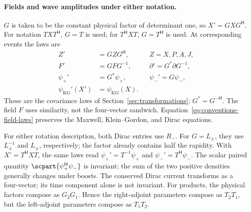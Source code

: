 \documentclass[11pt]{article}
\newcommand{\pv}[1]{{#1}}
\newcommand{\pvGreek}[1]{{#1}}
\newcommand{\pA}{\pv{A}}
\newcommand{\pF}{\pv{F}}
\newcommand{\pG}{\pv{G}}
\newcommand{\pJ}{\pv{J}}
\newcommand{\pL}{\pv{L}}
\newcommand{\pP}{\pv{P}}
\newcommand{\pR}{\pv{R}}
\newcommand{\pT}{\pv{T}}
\newcommand{\pX}{\pv{X}}
\newcommand{\pZ}{\pv{Z}}
\newcommand{\pvpartial}{\pvGreek{\partial}}
\newcommand{\pvpsi}{\pvGreek{\psi}}
\numberwithin{equation}{section}
\begin{document}
\paragraph{Fields and wave amplitudes under either notation.}
$\pG$ is taken to be the constant physical factor of determinant one, so $\pX'=\pG \pX \pG^{\mathsf H}$.
For notation $\pT \pX \pT^{\mathsf H}$, $\pG=\pT$ is used; for $\pT^{\mathsf H}\pX \pT$,
$\pG=\pT^{\mathsf H}$ is used. At corresponding events the laws are
\begin{equation}
 \begin{aligned}
 \pZ'&=\pG \pZ \pG^{\mathsf H},&& \pZ=\pX,\pP,\pA,\pJ,\\
 \pF'&=\pG \pF \pG^{-1},&&\pvpartial'=\pG^*\pvpartial \pG^{-1},\\
 \pvpsi_+'&=\pG^*\pvpsi_+,&&\pvpsi_-'=\pG\pvpsi_-,\\
 \psi_{\mathrm{KG}}'(\pX')&=\psi_{\mathrm{KG}}(\pX).
 \end{aligned}
 \label{eq:conventions-field-laws}
\end{equation}
These are the covariance laws of Section~\ref{sec:transformations};
$\pG^*=\pG^{-\mathsf H}$.  The field $\pF$ uses similarity, not the
four-vector sandwich.  Equation~\eqref{eq:conventions-field-laws} preserves
the Maxwell, Klein--Gordon, and Dirac equations.

For either rotation description, both Dirac entries use $\pR_-$.
For $\pG=\pL_\pm$, they use $\pL_\pm^{-1}$ and $\pL_\pm$, respectively;
the factor already contains half the rapidity.
With $\pX'=\pT^{\mathsf H}\pX \pT$, the same laws read
$\pvpsi_+'=\pT^{-1}\pvpsi_+$ and $\pvpsi_-'=\pT^{\mathsf H}\pvpsi_-$.
The scalar paired quantity $\scpart{\pvpsi_+^{\mathsf H}\pvpsi_-}$ is invariant;
the sum of the two positive densities generally changes under boosts.
The conserved Dirac current transforms as a four-vector; its time component
alone is not invariant.
For products, the physical factors compose as $\pG_2\pG_1$.  Hence the
right-adjoint parameters compose as $\pT_2\pT_1$, but the left-adjoint
parameters compose as $\pT_1\pT_2$.
\end{document}
